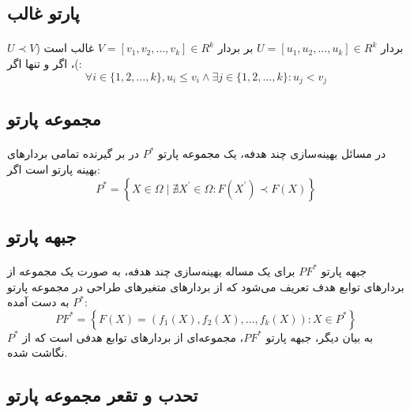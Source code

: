 \documentclass[a4paper,titlepage,12pt,fleqn,oneside]{report}
\begin{document}
	\subsection{پارتو غالب }
	\paragraph{}
	بردار $U=\left[u_{1}, u_{2}, \ldots, u_{k}\right] \in R^{k}$ بر بردار $V=\left[v_{1}, v_{2}, \ldots, v_{k}\right] \in R^{k}$ غالب است ($U \prec V$)، اگر و تنها اگر:
	\begin{equation}
		\forall i \in\{1,2, \ldots, k\}, u_{i} \leq v_{i} \wedge \exists j \in\{1,2, \ldots, k\}: u_{j}<v_{j}
	\end{equation}
	\subsection{مجموعه پارتو }
	\paragraph{}
	در مسائل بهینه‌سازی چند هدفه، یک مجموعه پارتو $P^{*}$ در بر گیرنده تمامی بردار‌های بهینه پارتو است اگر:
	\begin{equation}
		P^{*}=\left\{X \in \Omega \mid \nexists X^{\prime} \in \Omega: F\left(X^{\prime}\right) \prec F(X)\right\}
	\end{equation}
	\subsection{جبهه پارتو }
	\paragraph{}
	جبهه پارتو $P F^{*}$ برای یک مساله بهینه‌سازی چند هدفه، به صورت یک مجموعه از بردار‌های توابع هدف تعریف می‌شود که از بردار‌های متغیر‌های طراحی در مجموعه پارتو $P^{*}$ به دست آمده:
	\begin{equation}
		P F^{*}=\left\{F(X)=\left(f_{1}(X), f_{2}(X), \ldots, f_{k}(X)\right): X \in P^{*}\right\}
	\end{equation}
	به بیان دیگر، جبهه پارتو $P F^{*}$، مجموعه‌ای از بردار‌های توابع هدفی است که از $P^{*}$ نگاشت شده.
	\subsection{تحدب و تقعر مجموعه پارتو}
\end{document}
